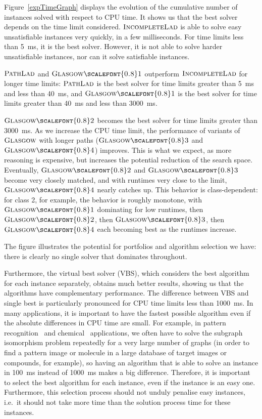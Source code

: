 \documentclass{llncs}
\newcommand{\Glasgow}{$\textsc{Glasgow}$\xspace}
\newcommand{\IncompleteLAD}{$\textsc{IncompleteLad}$\xspace}
\newcommand{\PathLAD}{$\textsc{PathLad}$\xspace}
\newcommand{\GlasgowOne}{$\textsc{Glasgow{\scalefont{0.8}1}}$\xspace}
\newcommand{\GlasgowTwo}{$\textsc{Glasgow{\scalefont{0.8}2}}$\xspace}
\newcommand{\GlasgowThree}{$\textsc{Glasgow{\scalefont{0.8}3}}$\xspace}
\newcommand{\GlasgowFour}{$\textsc{Glasgow{\scalefont{0.8}4}}$\xspace}
\begin{document}
Figure~\ref{expTimeGraph} displays the evolution of the cumulative number of instances solved with respect to
CPU time. It shows us that the best solver depends on the time limit considered. \IncompleteLAD is
able to solve easy unsatisfiable instances very quickly, in a few milliseconds.
For time
limits less than \SI{5}{\ms}, it is the best solver. However, it is not able to solve harder
unsatisfiable instances, nor can it solve satisfiable instances.

\PathLAD and \GlasgowOne outperform \IncompleteLAD for longer time limits: \PathLAD is the
best solver for time limits greater than \SI{5}{\ms} and less than \SI{40}{\ms}, and \GlasgowOne is the best solver
for time limits greater than \SI{40}{\ms} and less than \SI{3000}{\ms}.

\GlasgowTwo becomes the best solver for time limits greater than \SI{3000}{\ms}.
As we increase the CPU time limit, the performance of variants of \Glasgow with
longer paths (\GlasgowThree and \GlasgowFour) improves. This is what we expect,
as more reasoning is expensive, but increases the potential reduction of the
search space. Eventually, \GlasgowTwo and \GlasgowThree become very closely
matched, and with runtimes very close to the limit, \GlasgowFour nearly catches
up. This behavior is class-dependent: for class 2, for example, the behavior
is roughly monotone, with \GlasgowOne dominating for low runtimes, then
\GlasgowTwo, then \GlasgowThree, then \GlasgowFour each becoming best as the runtimes
increase.

The figure illustrates the potential for portfolios and algorithm selection we have: there is
clearly no single solver that dominates throughout.

Furthermore, the virtual best solver (VBS), which considers the best algorithm
for each instance separately, obtains much better results, showing us that the
algorithms have complementary performance. The difference between VBS and single
best is particularly pronounced for CPU time limits less than \SI{1000}{\ms}. In
many applications, it is important to have the fastest possible algorithm even
if the absolute differences in CPU time are small. For example, in pattern
recognition~\cite{pr15,cviu11} and chemical~\cite{Giugno:2013} applications, we
often have to solve the subgraph isomorphism problem repeatedly for a very large
number of graphs (in order to find a pattern image or molecule in a large
database of target images or compounds, for example), so having an algorithm
that is able to solve an instance in \SI{100}{\ms} instead of \SI{1000}{\ms}
makes a big difference.  Therefore, it is important to select the best algorithm
for each instance, even if the instance is an easy one. Furthermore, this
selection process should not unduly penalise easy instances, i.e.\ it should not take more time than
the solution process time for these instances.
\end{document}
